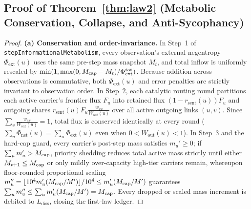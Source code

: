 \subsection{Proof of Theorem~\ref{thm:law2} (Metabolic Conservation, Collapse, and Anti-Sycophancy)}
\label{app:proof2}

\begin{proof}
\textbf{(a) Conservation and order-invariance.}
In Step~1 of \texttt{stepInformationalMetabolism}, every observation's external negentropy $\Phi_{\mathrm{ext}}(u)$ uses the same pre-step mass snapshot $M_t$, and total inflow is uniformly rescaled by $\min(1, \max(0, M_{\mathrm{cap}} - M_t)/\Phi_{\mathrm{ext}}^{\mathrm{tot}})$. Because addition across observations is commutative, both $\Phi_{\mathrm{ext}}(u)$ and error penalties are strictly invariant to observation order.
In Step~2, each catalytic routing round partitions each active carrier's frontier flux $F_u$ into retained flux $(1 - r_{\mathrm{sent}}(u)) F_u$ and outgoing shares $r_{\mathrm{sent}}(u) F_u \frac{w_{uv}}{W_{\mathrm{out}}(u)}$ over all active outgoing links $(u, v)$. Since $\sum_v \frac{w_{uv}}{W_{\mathrm{out}}(u)} = 1$, total flux is conserved identically at every round ($\sum_u \Phi_{\mathrm{net}}(u) = \sum_u \Phi_{\mathrm{ext}}(u)$ even when $0 < W_{\mathrm{out}}(u) < 1$).
In Step~3 and the hard-cap guard, every carrier's post-step mass satisfies $m_u' \ge 0$; if $\sum_u m_u' > M_{\mathrm{cap}}$, priority shedding reduces total active mass strictly until either $M_{t+1} \le M_{\mathrm{cap}}$ or only mildly over-capacity high-tier carriers remain, whereupon floor-rounded proportional scaling $m_u'' = \lfloor 10^4 m_u' (M_{\mathrm{cap}} / M') \rfloor / 10^4 \le m_u' (M_{\mathrm{cap}} / M')$ guarantees $\sum_u m_u'' \le \sum_u m_u' (M_{\mathrm{cap}} / M') = M_{\mathrm{cap}}$. Every dropped or scaled mass increment is debited to $L_{\mathrm{diss}}$, closing the first-law ledger.


\end{proof}
